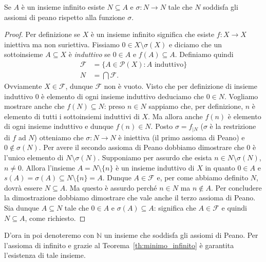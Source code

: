 \documentclass[italian,a4paper,twosides,headinclude]{scrbook}
\renewcommand{\subset}{\subseteq}
\newcommand{\NN}{\mathbb N}
\begin{document}
\begin{theorem}[$\NN$ è il più piccolo insieme infinito]
\label{th:minimo_infinito}
Se $A$ è un insieme infinito esiste $N\subset A$ e $\sigma\colon N\to N$ tale che $N$ soddisfa gli assiomi di peano rispetto alla funzione $\sigma$.
\end{theorem}
%
\begin{proof}
Per definizione se $X$ è un insieme infinito significa che esiste $f\colon X \to X$ iniettiva ma non suriettiva. Fissiamo $0\in X\setminus \sigma(X)$ e diciamo che un sottoinsieme $A\subset X$ è \emph{induttivo} se $0\in A$ e $f(A)\subset A$.
Definiamo quindi
\begin{align*}
  \mathcal F &= \{A\in \mathcal P(X)\colon \text{$A$ induttivo}\}\\
  N &= \bigcap \mathcal F.
\end{align*}
Ovviamente $X\in \mathcal F$, dunque $\mathcal F$ non è vuoto. Visto che per definizione di insieme induttivo $0$ è elemento di ogni insieme induttivo deduciamo che $0\in N$.
Vogliamo mostrare anche che $f(N)\subset N$: preso $n\in N$ sappiamo che, per definizione, $n$ è elemento di tutti i sottoinsiemi induttivi di $X$. Ma allora anche $f(n)$ è elemento di ogni insieme induttivo e dunque $f(n)\in N$. Posto $\sigma = f_{|N}$ ($\sigma$ è la restrizione di $f$ ad $N$) otteniamo che $\sigma\colon N\to N$ è iniettiva (il primo assioma di Peano) e $0\not \in \sigma(N)$. Per avere il secondo assioma di Peano dobbiamo dimostrare che $0$ è l'unico elemento di $N\setminus \sigma(N)$. Supponiamo per assurdo che esista $n\in N\setminus \sigma(N)$, $n\neq 0$. Allora l'insieme $A=N\setminus\{n\}$ è un insieme induttivo di $X$ in quanto $0\in A$ e $s(A) = \sigma(A) \subset N\setminus\{n\} = A$. Dunque $A\in \mathcal F$ e, per come abbiamo definito $N$, dovrà essere $N \subset A$. Ma questo è assurdo perché $n\in N$ ma $n\not \in A$. Per concludere la dimostrazione dobbiamo dimostrare che vale anche il terzo assioma di Peano. Sia dunque $A\subset N$ tale che $0\in A$ e $\sigma(A)\subset A$: significa che $A\in \mathcal F$ e quindi $N\subset A$, come richiesto.
\end{proof}

D'ora in poi denoteremo con $\NN$ un insieme che soddisfa gli assiomi di Peano. Per l'assioma di infinito e grazie al Teorema~\ref{th:minimo_infinito} è garantita l'esistenza di tale insieme.
\end{document}
